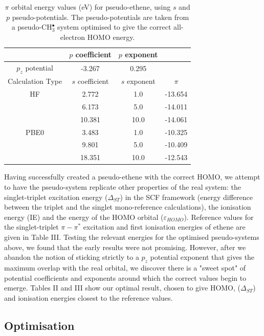 \documentclass[aip]{revtex4-1}
\begin{document}
\begin{table}[ht]
\begin{tabular}{c c c c}
\hline\hline
& \(p\) coefficient & \(p\) exponent \\
\hline
\(p_{z}\) potential & -3.267 & 0.295 \\
\hline
Calculation Type & \(s\) coefficient & \(s\) exponent & \(\pi\) \\
\hline
HF & 2.772 & 1.0 & -13.654 \\
 & 6.173 & 5.0 & -14.011 \\
 & 10.381 & 10.0 & -14.061 \\
\hline
PBE0 & 3.483 & 1.0 & -10.325 \\
 & 9.801 & 5.0 & -10.409 \\
 & 18.351 & 10.0 & -12.543 \\
\hline\hline
\end{tabular}
\caption{\(\pi\) orbital energy values (eV) for pseudo-ethene, using \(s\) and \(p\) pseudo-potentials.
The pseudo-potentials are taken from a pseudo-CH\(^{\bullet}_{3}\) system optimised to give the correct all-electron HOMO energy.}
\label{table:p_potentials}
\end{table}

Having successfully created a pseudo-ethene with the correct HOMO, we attempt to have the pseudo-system replicate other properties of the real system:
the singlet-triplet excitation energy ($\Delta_{ST}$) in the SCF framework (energy difference between the triplet and the singlet mono-reference
calculations), the ionisation energy (IE) and the energy of the HOMO orbital ($\varepsilon_{HOMO}$). Reference values for the singlet-triplet \(\pi-\pi^{*}\) excitation and first ionisation energies of ethene are given in Table III. Testing the relevant energies for the optimised pseudo-systems above, we found that the early results were not promising. However, after we abandon the notion of sticking strictly to a \(p_{z}\) potential exponent that gives the maximum overlap with the real orbital, we discover there is a "sweet spot" of potential coefficients and exponents around which the correct values begin to emerge. Tables II and III show our optimal result, chosen to give HOMO, ($\Delta_{ST}$) and ionisation energies closest to the reference values. 

\subsection*{Optimisation}
\end{document}
